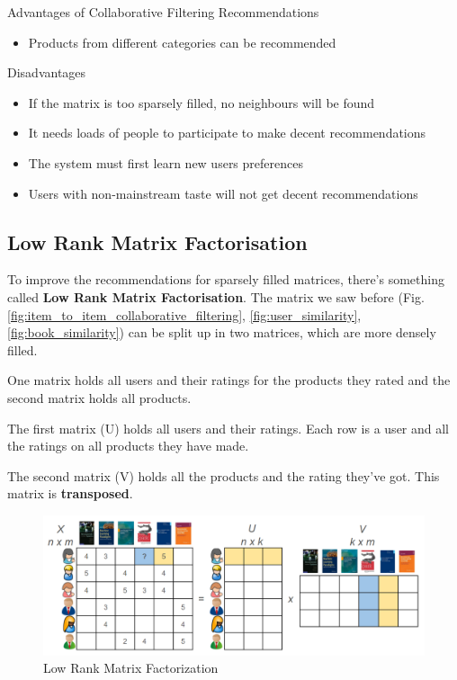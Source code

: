 \documentclass[11pt]{article}
\begin{document}
Advantages of Collaborative Filtering Recommendations

\begin{itemize}
    \item Products from different categories can be recommended
\end{itemize}

Disadvantages

\begin{itemize}
    \item If the matrix is too sparsely filled, no neighbours will be found
    \item It needs loads of people to participate to make decent recommendations
    \item The system must first learn new users preferences
    \item Users with non-mainstream taste will not get decent recommendations
\end{itemize}

\vspace{10px}

\subsection{Low Rank Matrix Factorisation}
\label{sec:matrix_factorization}

To improve the recommendations for sparsely filled matrices, there's something called \textbf{Low Rank Matrix Factorisation}. The matrix we saw before (Fig. \ref{fig:item_to_item_collaborative_filtering},
\ref{fig:user_similarity}, \ref{fig:book_similarity}) can be split up in two matrices, which are more densely filled.

One matrix holds all users and their ratings for the products they rated and the second matrix holds all products.


The first matrix (U) holds all users and their ratings. Each row is a user and all the ratings on all products they have made.

The second matrix (V) holds all the products and the rating they've got. This matrix is \textbf{transposed}.

\begin{figure}[htb!]
    \centering
    \includegraphics[keepaspectratio=true, width=\linewidth]{matrix_factorization.png}
    \caption{Low Rank Matrix Factorization}
    \label{fig:matrix_factorization}
\end{figure}
\end{document}
